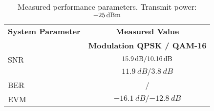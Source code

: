 \begin{table}[htbp]
  \centering
  \caption{Measured performance parameters. Transmit power: $\SI{-25}{dBm}$}
    \begin{tabular}{lc}
    \rowcolor[rgb]{ 0,  0,  0} \textcolor[rgb]{ 1,  1,  1}{\textbf{System Parameter}}	& \textcolor[rgb]{ 1,  1,  1}{\textbf{Measured Value}} 		\\
    \rowcolor[rgb]{ 0,  0,  0} \textcolor[rgb]{ 1,  1,  1}{} & \textcolor[rgb]{ 1,  1,  1}{\textbf{Modulation QPSK / QAM-16}}					\\

    	SNR 													& $\SI{15.9}{dB} / \SI{10.16}{dB}$					\\
	\ebnot 													& $\SI{11.9}{dB} / \SI{3.8}{dB}$								\\    	
	BER			 											& \measBERQPSKBad / \measBERQAMBad		\\
	EVM 													& $\SI{-16.1}{dB} / \SI{-12.8}{dB}$								\\

 \end{tabular}
  \label{tab:meas_params_bad}
\end{table}